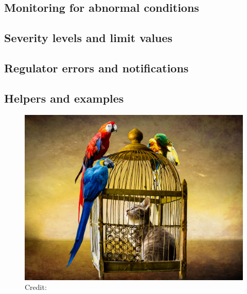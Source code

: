 \documentclass[10pt]{beamer}
\begin{document}
\addtocounter{framenumber}{-1}
\begin{frame}[plain]
\section{Monitoring for abnormal conditions}
\subsection{Severity levels and limit values}
\subsection{Regulator errors and notifications}
\subsection{Helpers and examples}
\begin{figure}
\includegraphics[scale=0.36]{image_dl/kissa-hakissa.jpg} \\
\scriptsize Credit:
\end{figure}
\end{frame}


\end{document}
